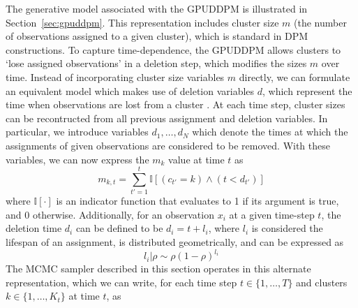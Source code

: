 \documentclass[smallcondensed, final]{svjour3}
\begin{document}
The generative model associated with the GPUDDPM is illustrated in Section~\ref{sec:gpuddpm}. This representation includes cluster size $m$ (the number of observations assigned to a given cluster), which is standard in DPM constructions. To capture time-dependence, the GPUDDPM allows clusters to `lose assigned observations' in a deletion step, which modifies the sizes $m$ over time. Instead of incorporating cluster size variables $m$ directly, we can formulate an equivalent model which makes use of deletion variables $d$, which represent the time when observations are lost from a cluster . At each time step, cluster sizes can be recontructed from all previous assignment and deletion variables. In particular, we introduce variables $d_{1}, \ldots, d_{N}$ which denote the times at which the assignments of given observations are considered to be removed. With these variables, we can now express the $m_{k}$ value at time $t$ as
\begin{equation}
\label{compute_clust_size}
m_{k,t} = \sum_{t' = 1}^{t} \mathbb{I}[(c_{t'}=k) \wedge (t < d_{t'})]
\end{equation}
where $\mathbb{I}[\cdot]$ is an indicator function that evaluates to 1 if its argument is true, and 0 otherwise. Additionally, for an observation $x_{i}$ at a given time-step $t$, the deletion time $d_{i}$ can be defined to be $d_{i} = t + l_{i}$, where $l_{i}$ is considered the lifespan of an assignment, is distributed geometrically, and can be expressed as
\begin{equation}
\label{del_rho_form}
l_{i} | \rho  \sim  \rho(1 - \rho)^{l_{i}}
\end{equation}
The MCMC sampler described in this section operates in this alternate representation, which we can write, for each time step $t \in \{1, \ldots, T\}$ and clusters $k \in \{ 1, \ldots, K_{t} \} $ at time $t$, as
\end{document}
